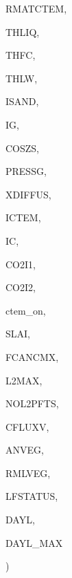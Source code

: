 {\begin{DoxyParamCaption}
\item[{real, dimension(ilg,ictem,ig)}]{R\+M\+A\+T\+C\+T\+E\+M, }
\item[{real, dimension(ilg,ig)}]{T\+H\+L\+I\+Q, }
\item[{real, dimension(ilg,ig)}]{T\+H\+F\+C, }
\item[{real, dimension(ilg,ig)}]{T\+H\+L\+W, }
\item[{integer, dimension(ilg,ig)}]{I\+S\+A\+N\+D, }
\item[{integer}]{I\+G, }
\item[{real, dimension(ilg)}]{C\+O\+S\+Z\+S, }
\item[{real, dimension(ilg)}]{P\+R\+E\+S\+S\+G, }
\item[{real, dimension(ilg)}]{X\+D\+I\+F\+F\+U\+S, }
\item[{integer}]{I\+C\+T\+E\+M, }
\item[{integer}]{I\+C, }
\item[{real, dimension(ilg,ictem)}]{C\+O2\+I1, }
\item[{real, dimension(ilg,ictem)}]{C\+O2\+I2, }
\item[{logical}]{ctem\+\_\+on, }
\item[{real, dimension(ilg,ictem)}]{S\+L\+A\+I, }
\item[{real, dimension(ilg,ictem)}]{F\+C\+A\+N\+C\+M\+X, }
\item[{integer}]{L2\+M\+A\+X, }
\item[{integer, dimension(ic)}]{N\+O\+L2\+P\+F\+T\+S, }
\item[{real, dimension(ilg)}]{C\+F\+L\+U\+X\+V, }
\item[{real, dimension(ilg,ictem)}]{A\+N\+V\+E\+G, }
\item[{real, dimension(ilg,ictem)}]{R\+M\+L\+V\+E\+G, }
\item[{integer, dimension(ilg,ictem)}]{L\+F\+S\+T\+A\+T\+U\+S, }
\item[{real, dimension(ilg)}]{D\+A\+Y\+L, }
\item[{real, dimension(ilg)}]{D\+A\+Y\+L\+\_\+\+M\+A\+X}
\end{DoxyParamCaption}
)}\label{TSOLVC_8f_a45f2f7d56f1e5097a5eb9ffb8b2e7d8d}

